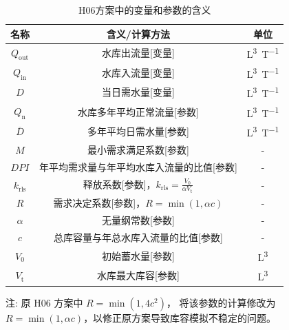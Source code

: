 \begin{table}[htbp]
  \centering
  \caption{H06方案中的变量和参数的含义}
  \label{tab:H06方案变量参数表}
  \begin{threeparttable}
    \begin{tabular}{ccc}
      \toprule
      名称               & 含义/计算方法                                                            & 单位              \\ \midrule
      $Q_{\mathrm{out}}$ & 水库出流量[变量]                                                         & \unit{L^3.T^{-1}} \\
      $Q_{\mathrm{in}}$  & 水库入流量[变量]                                                         & \unit{L^3.T^{-1}} \\
      $D$                & 当日需水量[变量]                                                         & \unit{L^3.T^{-1}} \\
      $Q_{\mathrm {n}} $ & 水库多年平均正常流量[参数]                                               & \unit{L^3.T^{-1}} \\
      $\overline{D}$     & 多年平均日需水量[参数]                                                   & \unit{L^3.T^{-1}} \\
      $M$                & 最小需求满足系数[参数]                                                   & -                 \\
      $DPI$              & 年平均需求量与年平均水库入流量的比值[参数]                               & -                 \\
      $k_{\mathrm{rls}}$ & 释放系数[参数]，$k_{\mathrm{rls}} = \frac{V_0}{\alpha V_{\mathrm {t}} }$ & -                 \\
      $R$                & 需求决定系数[参数]，$R=\min(1, \alpha c)$                                & -                 \\
      $\alpha$           & 无量纲常数[参数]                                                         & -                 \\
      $c$                & 总库容量与年总水库入流量的比值[参数]                                     & -                 \\
      $V_0$              & 初始蓄水量[参数]                                                         & \unit{L^3}        \\
      $V_{\mathrm {t}} $ & 水库最大库容[参数]                                                       & \unit{L^3}        \\
      \bottomrule
    \end{tabular}
    \begin{tablenotes}
      \footnotesize
    \item[注:] 原 H06 方案中 $R=\min(1,4 c^2)$，\citet{Shin-etal_19} 将该参数的计算修改为 $R=\min(1,\alpha c)$，以修正原方案导致库容模拟不稳定的问题。
    \end{tablenotes}
  \end{threeparttable}
\end{table}

